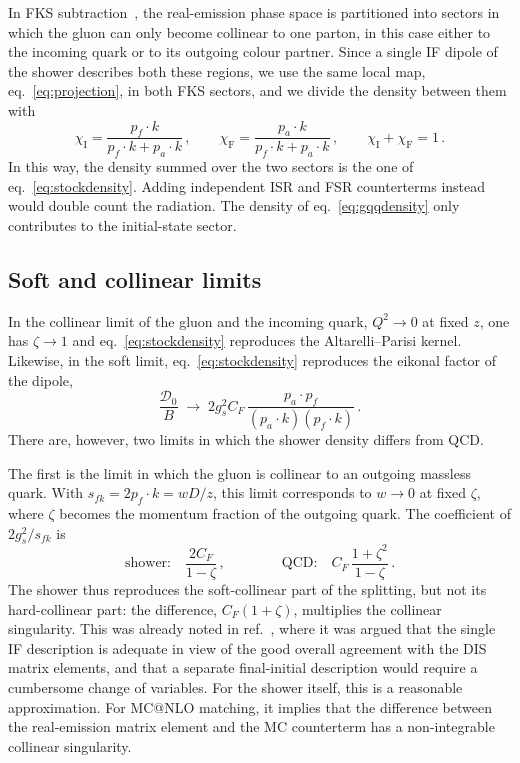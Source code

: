 \documentclass[a4paper,11pt]{article}
\makeatletter
\newcommand{\mcatnlo}{MC@NLO\xspace}
\newcommand{\Dens}{\mathcal{D}}
\makeatother
\begin{document}
In FKS subtraction~\cite{Frixione:1995ms,Frixione:1997np,Frederix:2009yq},
the real-emission phase space is partitioned into sectors in which the
gluon can only become collinear to one parton, in this case either to
the incoming quark or to its outgoing colour partner. Since a single
IF dipole of the shower describes both these regions, we use the same
local map, eq.~\eqref{eq:projection}, in both FKS sectors, and we
divide the density between them with
\begin{equation}
  \chi_{\mathrm{I}}=\frac{p_f\cdot k}{p_f\cdot k+p_a\cdot k}\,,\qquad
  \chi_{\mathrm{F}}=\frac{p_a\cdot k}{p_f\cdot k+p_a\cdot k}\,,\qquad
  \chi_{\mathrm{I}}+\chi_{\mathrm{F}}=1\,.
  \label{eq:partition}
\end{equation}
In this way, the density summed over the two sectors is the one of
eq.~\eqref{eq:stockdensity}. Adding independent ISR and FSR
counterterms instead would double count the radiation. The
density of eq.~\eqref{eq:gqqdensity} only contributes to the
initial-state sector.

\subsection{Soft and collinear limits}
\label{sec:limits}

In the collinear limit of the gluon and the incoming quark, $Q^2\to0$
at fixed $z$, one has $\zeta\to1$ and eq.~\eqref{eq:stockdensity}
reproduces the Altarelli--Parisi kernel. Likewise, in the soft limit,
eq.~\eqref{eq:stockdensity} reproduces the eikonal factor of the
dipole,
\begin{equation}
  \frac{\Dens_{0}}{B}\;\to\;2g_s^2C_F\,\frac{p_a\cdot p_f}{(p_a\cdot k)(p_f\cdot k)}\,.
  \label{eq:eikonal}
\end{equation}
There are, however, two limits in which the shower density differs
from QCD.

The first is the limit in which the gluon is collinear to an outgoing
massless quark. With $s_{fk}=2p_f\cdot k=wD/z$, this limit corresponds
to $w\to0$ at fixed $\zeta$, where $\zeta$ becomes the momentum
fraction of the outgoing quark. The coefficient of $2g_s^2/s_{fk}$ is
\begin{equation}
  \text{shower:}\quad\frac{2C_F}{1-\zeta}\,,\qquad\qquad
  \text{QCD:}\quad C_F\,\frac{1+\zeta^2}{1-\zeta}\,.
  \label{eq:finalcollinear}
\end{equation}
The shower thus reproduces the soft-collinear part of the splitting,
but not its hard-collinear part: the difference, $C_F(1+\zeta)$,
multiplies the collinear singularity. This was already noted in
ref.~\cite{Cabouat:2017rzi}, where it was argued that the single IF
description is adequate in view of the good overall agreement with the
DIS matrix elements, and that a separate final-initial description
would require a cumbersome change of variables. For the shower
itself, this is a reasonable approximation. For \mcatnlo matching, it
implies that the difference between the real-emission matrix element
and the MC counterterm has a non-integrable collinear singularity.
\end{document}
